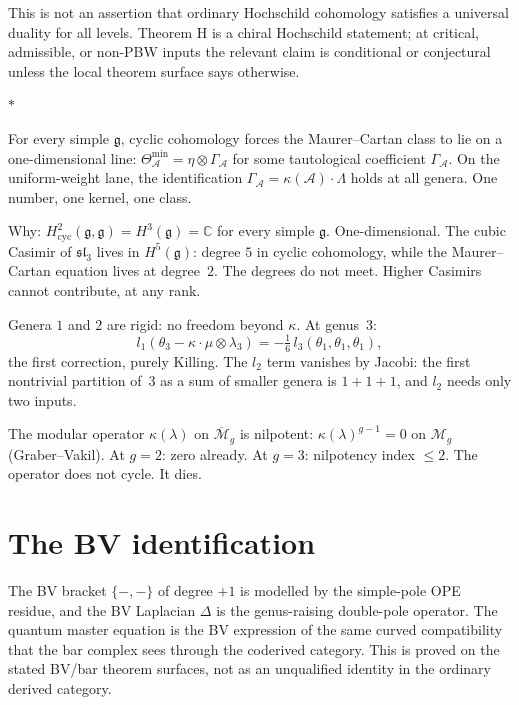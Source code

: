 \documentclass[11pt]{article}
\newcommand{\cA}{\mathcal{A}}
\newcommand{\cM}{\mathcal{M}}
\newcommand{\fg}{\mathfrak{g}}
\newcommand{\fsl}{\mathfrak{sl}}
\newcommand{\C}{\mathbb{C}}
\newcommand{\sep}{\bigskip\begin{center}$*$\end{center}\medskip}
\begin{document}
This is not an assertion that ordinary Hochschild cohomology
satisfies a universal duality for all levels.  Theorem H is a
chiral Hochschild statement; at critical, admissible, or
non-PBW inputs the relevant claim is conditional or conjectural
unless the local theorem surface says otherwise.

\sep

For every simple $\fg$, cyclic cohomology forces the
Maurer--Cartan class to lie on a one-dimensional line:
$\Theta^{\min}_\cA = \eta \otimes \Gamma_\cA$ for some
tautological coefficient $\Gamma_\cA$.  On the uniform-weight
lane, the identification $\Gamma_\cA = \kappa(\cA) \cdot \Lambda$
holds at all genera.  One number, one kernel, one class.

Why: $H^2_{\mathrm{cyc}}(\fg,\fg) = H^3(\fg) = \C$ for every
simple $\fg$.  One-dimensional.  The cubic Casimir of $\fsl_3$
lives in $H^5(\fg)$: degree $5$ in cyclic cohomology, while
the Maurer--Cartan equation lives at degree~$2$.  The degrees
do not meet.  Higher Casimirs cannot contribute, at any rank.

Genera $1$ and $2$ are rigid: no freedom beyond $\kappa$.  At
genus~$3$:
\[
l_1(\theta_3 - \kappa \cdot \mu \otimes \lambda_3)
= -\tfrac{1}{6}\, l_3(\theta_1, \theta_1, \theta_1),
\]
the first correction, purely Killing.  The $l_2$ term vanishes
by Jacobi: the first nontrivial partition of~$3$ as a sum of
smaller genera is $1 + 1 + 1$, and $l_2$ needs only two inputs.

The modular operator $\kappa(\lambda)$ on $\overline{\cM}_g$
is nilpotent: $\kappa(\lambda)^{g-1} = 0$ on $\cM_g$
(Graber--Vakil).  At $g = 2$: zero already.  At $g = 3$:
nilpotency index $\leq 2$.  The operator does not cycle.  It dies.


\section{The BV identification}
\label{sec:bv}

The BV bracket $\{-,-\}$ of degree $+1$ is modelled by the
simple-pole OPE residue, and the BV Laplacian $\Delta$ is the
genus-raising double-pole operator.  The quantum master equation
is the BV expression of the same curved compatibility that the
bar complex sees through the coderived category.  This is proved
on the stated BV/bar theorem surfaces, not as an unqualified
identity in the ordinary derived category.
\end{document}
